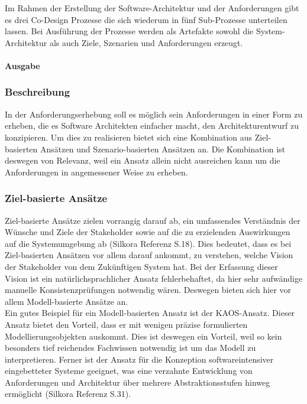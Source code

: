 Im Rahmen der Erstellung der Software-Architektur und der Anforderungen gibt es drei Co-Design Prozesse die sich wiederum in fünf Sub-Prozesse unterteilen lassen. Bei Ausführung der Prozesse werden als Artefakte sowohl die System-Architektur als auch Ziele, Szenarien und Anforderungen erzeugt. \\

\paragraph{Ausgabe}


\subsubsection{Beschreibung}
In der Anforderungserhebung soll es m\"oglich sein Anforderungen in einer Form zu erheben, die es Software Architekten einfacher macht, den Architekturentwurf zu konzipieren. Um dies zu realisieren bietet sich eine Kombination aus Ziel-basierten Ans\"atzen und Szenario-basierten Ans\"atzen an. Die Kombination ist deswegen von Relevanz, weil ein Ansatz allein nicht ausreichen kann um die Anforderungen in angemessener Weise zu erheben.\\

\subsubsection{Ziel-basierte Ans\"atze}
Ziel-basierte Ans\"atze zielen vorrangig darauf ab, ein umfassendes Verst\"andnis der W\"unsche und Ziele der Stakeholder sowie auf die zu erzielenden Auswirkungen auf die Systemumgebung ab (Silkora Referenz S.18). Dies bedeutet, dass es bei Ziel-basierten Ans\"atzen vor allem darauf ankommt, zu verstehen, welche Vision der Stakeholder von dem Zuk\"unftigen System hat. Bei der Erfassung dieser Vision ist ein nat\"urlichsprachlicher Ansatz fehlerbehaftet, da hier sehr aufw\"andige manuelle Konsistenzpr\"ufungen notwendig w\"aren. Deswegen bieten sich hier vor allem Modell-basierte Ans\"atze an.\\

Ein gutes Beispiel f\"ur ein Modell-basierten Ansatz ist der KAOS-Ansatz. Dieser Ansatz bietet den Vorteil, dass er mit wenigen pr\"azise formulierten Modellierungsobjekten auskommt. Dies ist deswegen ein Vorteil, weil so kein besonders tief reichendes Fachwissen notwendig ist um das Modell zu interpretieren. Ferner ist der Ansatz f\"ur die Konzeption softwareintensiver eingebetteter Systeme geeignet, was eine verzahnte Entwicklung von Anforderungen und Architektur \"uber mehrere Abstraktionsstufen hinweg erm\"oglicht (Silkora Referenz S.31).\\

